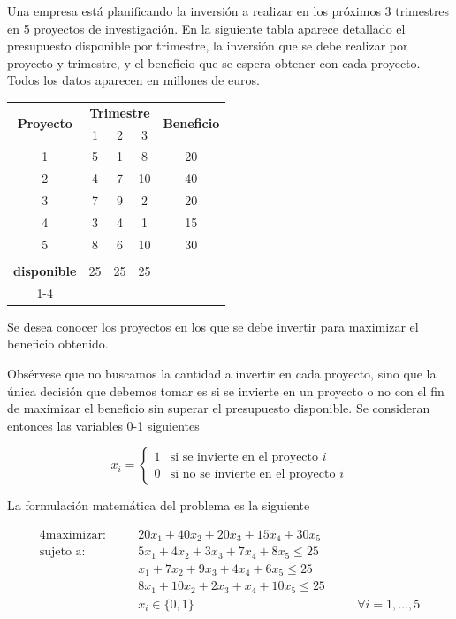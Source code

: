 \begin{ejemplo}
    Una empresa está planificando la inversión a realizar en los próximos 3 trimestres en 5 proyectos de investigación. En 
    la siguiente tabla aparece detallado el presupuesto disponible por trimestre, la inversión que se debe realizar por
    proyecto y trimestre, y el beneficio que se espera obtener con cada proyecto. Todos los datos aparecen en millones de 
    euros.

    \begin{center}
        \begin{tabular}{|c|ccc|c|}
        \hline
        \multirow{2}{*}{\textbf{Proyecto}} & \multicolumn{3}{c|}{\textbf{Trimestre}} & \multirow{2}{*}{\textbf{Beneficio}} \\
         & 1 & 2 & 3 & \\
        \hline
        1 & 5 & 1 & 8 & 20 \\
        2 & 4 & 7 & 10 & 40 \\
        3 & 7 & 9 & 2 & 20 \\
        4 & 3 & 4 & 1 & 15 \\
        5 & 8 & 6 & 10 & 30 \\
        \hline
        \shortstack{\textbf{Presupuesto} \\ \textbf{disponible}} & 25 & 25 & 25 & \multicolumn{1}{c}{} \\
        \cline{1-4}
        \end{tabular}
    \end{center}

    Se desea conocer los proyectos en los que se debe invertir para maximizar el beneficio obtenido.
\end{ejemplo}

Obsérvese que no buscamos la cantidad a invertir en cada proyecto, sino que la única decisión que debemos tomar es si se
invierte en un proyecto o no con el fin de maximizar el beneficio sin superar el presupuesto disponible. Se consideran 
entonces las variables 0-1 siguientes

\[
    x_i=
    \begin{cases}
        1 & \text{si se invierte en el proyecto } i \\
        0 & \text{si no se invierte en el proyecto } i
    \end{cases}
\]

\newpage

La formulación matemática del problema es la siguiente

\begin{alignat}{4}
    \text{maximizar:}   & \quad & 20x_1+40x_2+20x_3+15x_4+30x_5     & \quad &           \\
    \text{sujeto a:}    & \quad & 5x_1+4x_2+3x_3+7x_4+8x_5\leq 25   &       &           \\
                        & \quad & x_1+7x_2+9x_3+4x_4+6x_5\leq 25    &       &           \\
                        & \quad & 8x_1+10x_2+2x_3+x_4+10x_5\leq 25  &       &           \\
                        & \quad & x_i\in \{0, 1\}                   &       & \forall i=1,\dots,5          
\end{alignat}

